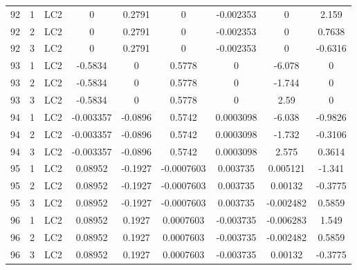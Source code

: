 \documentclass{article}%
\begin{document}
\begin{longtable}{| c c c | c c c c c c |}
92&1&LC2&0&0.2791&0&{-}0.002353&0&2.159\\%
92&2&LC2&0&0.2791&0&{-}0.002353&0&0.7638\\%
92&3&LC2&0&0.2791&0&{-}0.002353&0&{-}0.6316\\%
93&1&LC2&{-}0.5834&0&0.5778&0&{-}6.078&0\\%
93&2&LC2&{-}0.5834&0&0.5778&0&{-}1.744&0\\%
93&3&LC2&{-}0.5834&0&0.5778&0&2.59&0\\%
94&1&LC2&{-}0.003357&{-}0.0896&0.5742&0.0003098&{-}6.038&{-}0.9826\\%
94&2&LC2&{-}0.003357&{-}0.0896&0.5742&0.0003098&{-}1.732&{-}0.3106\\%
94&3&LC2&{-}0.003357&{-}0.0896&0.5742&0.0003098&2.575&0.3614\\%
95&1&LC2&0.08952&{-}0.1927&{-}0.0007603&0.003735&0.005121&{-}1.341\\%
95&2&LC2&0.08952&{-}0.1927&{-}0.0007603&0.003735&0.00132&{-}0.3775\\%
95&3&LC2&0.08952&{-}0.1927&{-}0.0007603&0.003735&{-}0.002482&0.5859\\%
96&1&LC2&0.08952&0.1927&0.0007603&{-}0.003735&{-}0.006283&1.549\\%
96&2&LC2&0.08952&0.1927&0.0007603&{-}0.003735&{-}0.002482&0.5859\\%
96&3&LC2&0.08952&0.1927&0.0007603&{-}0.003735&0.00132&{-}0.3775\\%
\end{longtable}%
\newpage%
\end{document}
